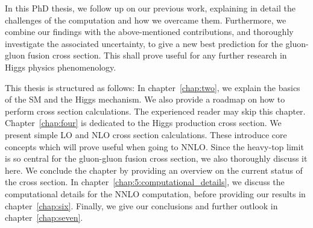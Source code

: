 In this PhD thesis, we follow up on our previous work, explaining in detail the challenges of the computation and how we overcame them. Furthermore, we combine our findings with the above-mentioned contributions, and thoroughly investigate the associated uncertainty, to give a new best prediction for the gluon-gluon fusion cross section. This shall prove useful for any further research in Higgs physics phenomenology.

This thesis is structured as follows: In chapter~\ref{chap:two}, we explain the basics of the \acs{SM} and the Higgs mechanism. We also provide a roadmap on how to perform cross section calculations. The experienced reader may skip this chapter. Chapter~\ref{chap:four} is dedicated to the Higgs production cross section. We present simple \acs{LO} and \acs{NLO} cross section calculations. These introduce core concepts which will prove useful when going to \acs{NNLO}. Since the heavy-top limit is so central for the gluon-gluon fusion cross section, we also thoroughly discuss it here. We conclude the chapter by providing an overview on the current status of the cross section. In chapter~\ref{chap:5:computational_details}, we discuss the computational details for the \acs{NNLO} computation, before providing our results in chapter~\ref{chap:six}. Finally, we give our conclusions and further outlook in chapter~\ref{chap:seven}.
